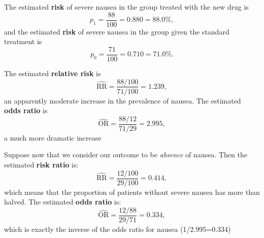 \documentclass[compress, notes=hide]{beamer}
\newcommand{\hl}[1]{\textbf{#1}}
\begin{document}
\begin{frame}
\begin{block}{}
  The estimated \hl{risk} of severe nausea in the group treated
  with the new drug is
\begin{equation*}
p_1 = \frac{88}{100} = 0.880 = 88.0\%,
\end{equation*}
and the estimated \hl{risk} of severe nausea in the group given the
standard treatment is
\begin{equation*}
p_0 = \frac{71}{100} = 0.710 = 71.0\%.
\end{equation*}
\end{block}
\end{frame}

\begin{frame}
\begin{block}{}
The estimated \hl{relative risk} is
\begin{equation*}
\widehat{\mathrm{RR}} = \frac{88/100}{71/100} = 1.239,
\end{equation*}
an apparently moderate increase in the prevalence of nausea. The
estimated \hl{odds ratio} is
\begin{equation*}
\widehat{\mathrm{OR}} = \frac{88/12}{71/29} = 2.995,
\end{equation*}
a much more dramatic increase
\end{block}
\end{frame}

\begin{frame}
\begin{block}{}
  Suppose now that we consider our outcome to be \emph{absence} of
  nausea. Then the estimated \hl{risk ratio} is:
\begin{equation*}
\widehat{\mathrm{RR}} = \frac{12/100}{29/100} = 0.414,
\end{equation*}
which means that the proportion of patients without severe nausea has
more than halved. The estimated \hl{odds ratio} is:
\begin{equation*}
\widehat{\mathrm{OR}} = \frac{12/88}{29/71} = 0.334,
\end{equation*}
which is exactly the inverse of the odds ratio for nausea (1/2.995=0.334)
\end{block}
\end{frame}
\end{document}
